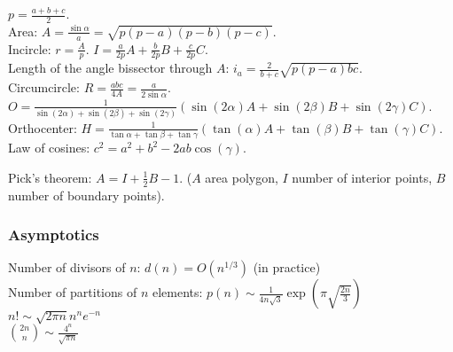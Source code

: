 \documentclass[landscape,a4paper,twocolumn,10pt]{report}
\begin{document}
$p=\frac{a+b+c}{2}$.\\
Area: $A=\frac{\sin\alpha}{a}=\sqrt{p(p-a)(p-b)(p-c)}$.\\
Incircle: $r=\frac{A}{p}$. $I=\frac{a}{2p}A+\frac{b}{2p}B+\frac{c}{2p}C$.\\
Length of the angle bissector through $A$: $i_a=\frac{2}{b+c}\sqrt{p(p-a)bc}$.\\
Circumcircle: $R=\frac{abc}{4A}=\frac{a}{2\sin\alpha}$. $O=\frac{1}{\sin(2\alpha)+\sin(2\beta)+\sin(2\gamma)}(\sin(2\alpha)A+\sin(2\beta)B+\sin(2\gamma)C)$.\\
Orthocenter: $H=\frac{1}{\tan\alpha+\tan\beta+\tan\gamma}(\tan(\alpha)A+\tan(\beta)B+\tan(\gamma)C)$.\\
Law of cosines: $c^2=a^2+b^2-2ab\cos(\gamma)$.

\noindent Pick's theorem: $A=I+\frac{1}{2}B-1$. ($A$ area polygon, $I$ number of interior points, $B$ number of boundary points).


\subsubsection*{Asymptotics}

\noindent
Number of divisors of $n$: $d(n) = O(n^{1/3})$ (in practice) \\ %
Number of partitions of $n$ elements: $p(n) \sim \frac{1}{4 n \sqrt{3}} \exp(\pi \sqrt{\frac{2n}{3}})$ \\ %
$n! \sim \sqrt{2 \pi n} n^n e^{-n}$ \\ %
$\binom{2n}{n} \sim \frac{4^n}{\sqrt{\pi n}}$

\end{document}
